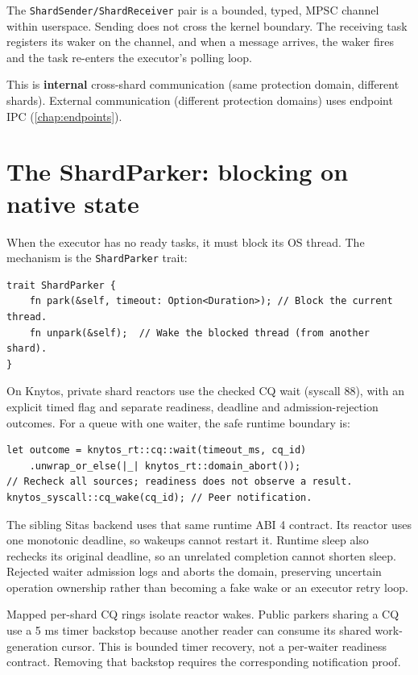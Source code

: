 The \texttt{ShardSender/ShardReceiver} pair is a bounded, typed, MPSC channel
within userspace. Sending does not cross the kernel boundary. The receiving task
registers its waker on the channel, and when a message arrives, the waker fires and
the task re-enters the executor's polling loop.

This is \textbf{internal} cross-shard communication (same protection domain,
different shards). External communication (different protection domains) uses
endpoint IPC (\autoref{chap:endpoints}).

\section{The ShardParker: blocking on native state}

When the executor has no ready tasks, it must block its OS thread. The mechanism
is the \texttt{ShardParker} trait:

\begin{lstlisting}[style=rustCode]
trait ShardParker {
    fn park(&self, timeout: Option<Duration>); // Block the current thread.
    fn unpark(&self);  // Wake the blocked thread (from another shard).
}
\end{lstlisting}

On Knytos, private shard reactors use the checked CQ wait (syscall 88),
with an explicit timed flag and separate readiness, deadline and admission-rejection
outcomes. For a queue with one waiter, the safe runtime boundary is:

\begin{lstlisting}[style=rustCode]
let outcome = knytos_rt::cq::wait(timeout_ms, cq_id)
    .unwrap_or_else(|_| knytos_rt::domain_abort());
// Recheck all sources; readiness does not observe a result.
knytos_syscall::cq_wake(cq_id); // Peer notification.
\end{lstlisting}

The sibling Sitas backend uses that same runtime ABI 4 contract. Its reactor
uses one monotonic deadline, so wakeups cannot restart it. Runtime sleep also
rechecks its original deadline, so an unrelated completion cannot shorten sleep.
Rejected waiter admission logs and aborts the domain, preserving uncertain
operation ownership rather than becoming a fake wake or an executor retry loop.

Mapped per-shard CQ rings isolate reactor wakes. Public parkers sharing a CQ
use a 5 ms timer backstop because another reader can consume its shared
work-generation cursor. This is bounded timer recovery, not a per-waiter readiness
contract. Removing that backstop requires the corresponding notification proof.

